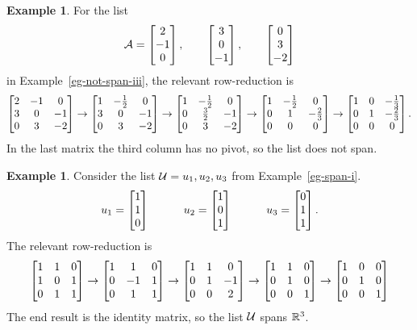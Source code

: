 \documentclass[reqno]{amsart}
\theoremstyle{definition}
\newtheorem{example}[theorem]{Example}
\begin{document}
\begin{example}
 For the list
 \[ \mathcal{A} = \left[\begin{matrix} 2 \\ -1 \\  0 \end{matrix}\right], \qquad
          \left[\begin{matrix} 3 \\  0 \\ -1 \end{matrix}\right], \qquad
          \left[\begin{matrix} 0 \\  3 \\ -2 \end{matrix}\right]
 \]
 in Example~\ref{eg-not-span-iii}, the relevant row-reduction is
 \[ \left[\begin{matrix} 2 & -1 & 0 \\ 3 & 0 & -1 \\ 0 & 3 & -2 \end{matrix}\right] \to
    \left[\begin{matrix} 1 & -\tfrac{1}{2} & 0 \\ 3 & 0 & -1 \\ 0 & 3 & -2 \end{matrix}\right] \to
    \left[\begin{matrix} 1 & -\tfrac{1}{2} & 0 \\ 0 & \tfrac{3}{2} & -1 \\ 0 & 3 & -2 \end{matrix}\right] \to
    \left[\begin{matrix} 1 & -\tfrac{1}{2} & 0 \\ 0 & 1 & -\tfrac{2}{3} \\ 0 & 0 & 0 \end{matrix}\right] \to
    \left[\begin{matrix} 1 & 0 & -\tfrac{1}{3} \\ 0 & 1 & -\tfrac{2}{3} \\ 0 & 0 & 0 \end{matrix}\right].
 \]
 In the last matrix the third column has no pivot, so the list does
 not span.
\end{example}
\begin{example}\label{eg-span-i-matrix}
 Consider the list $\mathcal{U}=u_1,u_2,u_3$ from Example~\ref{eg-span-i}.
 \[ u_1 = \left[\begin{matrix} 1 \\ 1 \\ 0 \end{matrix}\right] \hspace{3em}
    u_2 = \left[\begin{matrix} 1 \\ 0 \\ 1 \end{matrix}\right] \hspace{3em}
    u_3 = \left[\begin{matrix} 0 \\ 1 \\ 1 \end{matrix}\right].
 \]
 The relevant row-reduction is
 \[ \left[\begin{matrix} 1 & 1 & 0 \\ 1 &  0 &  1 \\ 0 & 1 & 1 \end{matrix}\right] \to
    \left[\begin{matrix} 1 & 1 & 0 \\ 0 & -1 &  1 \\ 0 & 1 & 1 \end{matrix}\right] \to
    \left[\begin{matrix} 1 & 1 & 0 \\ 0 &  1 & -1 \\ 0 & 0 & 2 \end{matrix}\right] \to
    \left[\begin{matrix} 1 & 1 & 0 \\ 0 &  1 &  0 \\ 0 & 0 & 1 \end{matrix}\right] \to
    \left[\begin{matrix} 1 & 0 & 0 \\ 0 &  1 &  0 \\ 0 & 0 & 1 \end{matrix}\right]
 \]
 The end result is the identity matrix, so the list $\mathcal{U}$ spans
 ${\mathbb{R}}^3$.
\end{example}
\end{document}
